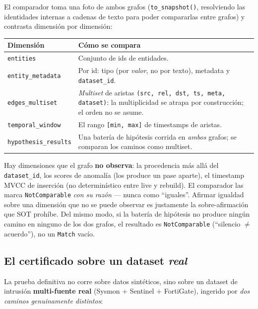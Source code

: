 \documentclass[11pt,a4paper]{article}
\newcommand{\code}[1]{\texttt{\small #1}}
\begin{document}
El comparador toma una foto de ambos grafos (\code{to\_snapshot()}, resolviendo
las identidades internas a cadenas de texto para poder compararlas entre
grafos) y contrasta dimensión por dimensión:

\begin{center}
\renewcommand{\arraystretch}{1.2}
\begin{tabular}{@{}p{3.9cm}p{10.5cm}@{}}
\toprule
\textbf{Dimensión} & \textbf{Cómo se compara} \\
\midrule
\code{entities} & Conjunto de ids de entidades. \\
\code{entity\_metadata} & Por id: tipo (por \emph{valor}, no por texto), metadata y \code{dataset\_id}. \\
\code{edges\_multiset} & \emph{Multiset} de aristas \code{(src, rel, dst, ts, meta, dataset)}: la multiplicidad se atrapa por construcción; el orden no se asume. \\
\code{temporal\_window} & El rango \code{[min, max]} de timestamps de aristas. \\
\code{hypothesis\_results} & Una batería de hipótesis corrida en \emph{ambos} grafos; se comparan los caminos como multiset. \\
\bottomrule
\end{tabular}
\end{center}

\begin{keybox}
Hay dimensiones que el grafo \textbf{no observa}: la procedencia más allá del
\code{dataset\_id}, los scores de anomalía (los produce un pase aparte), el
timestamp MVCC de inserción (no determinístico entre live y rebuild). El
comparador las marca \code{NotComparable} \emph{con su razón} --- nunca como
``iguales''. Afirmar igualdad sobre una dimensión que no se puede observar es
justamente la sobre-afirmación que SOT prohíbe. Del mismo modo, si la batería
de hipótesis no produce ningún camino en ninguno de los dos grafos, el
resultado es \code{NotComparable} (``silencio $\neq$ acuerdo''), no un
\code{Match} vacío.
\end{keybox}

\subsection{El certificado sobre un dataset \emph{real}}

La prueba definitiva no corre sobre datos sintéticos, sino sobre un dataset de
intrusión \textbf{multi-fuente real} (Sysmon $+$ Sentinel $+$ FortiGate),
ingerido por \emph{dos caminos genuinamente distintos}:
\end{document}
